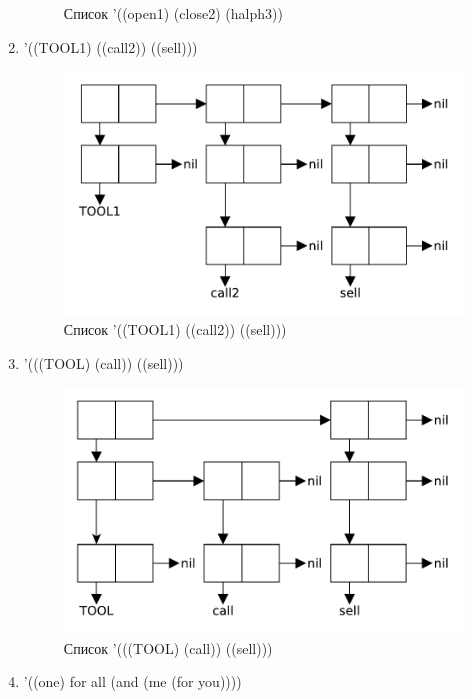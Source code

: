 \begin{enumerate}
\begin{figure}[H]
            \caption{Список '((open1) (close2) (halph3))}
        \end{figure}
    \item '((TOOL1) ((call2)) ((sell)))
        \begin{figure}[H]
            \centering
            \includegraphics[scale=0.75]{data/pdf/01-04.pdf}
            \caption{Список '((TOOL1) ((call2)) ((sell)))}
        \end{figure}
    \item '(((TOOL) (call)) ((sell)))
        \begin{figure}[H]
            \centering
            \includegraphics[scale=0.75]{data/pdf/01-05.pdf}
            \caption{Список '(((TOOL) (call)) ((sell)))}
        \end{figure}
    \item '((one) for all (and (me (for you))))
        \begin{figure}[H]
            \centering

\end{figure}
\end{enumerate}
